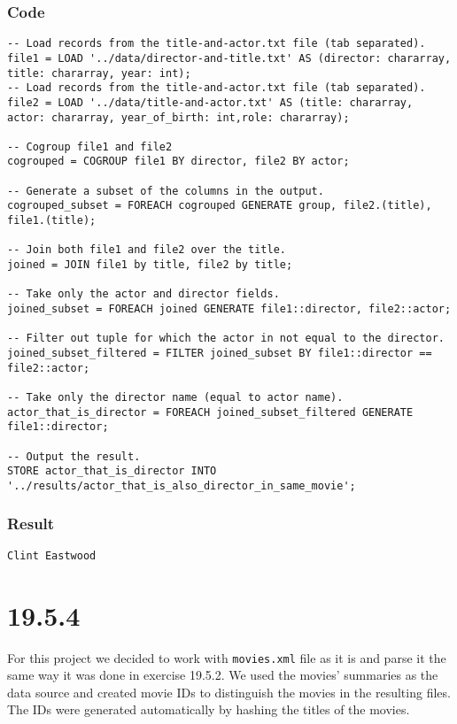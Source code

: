 \documentclass[a4paper, notitlepage]{article}
\begin{document}
\subsubsection{Code}

\begin{lstlisting}
-- Load records from the title-and-actor.txt file (tab separated).
file1 = LOAD '../data/director-and-title.txt' AS (director: chararray, title: chararray, year: int);
-- Load records from the title-and-actor.txt file (tab separated).
file2 = LOAD '../data/title-and-actor.txt' AS (title: chararray, actor: chararray, year_of_birth: int,role: chararray);

-- Cogroup file1 and file2
cogrouped = COGROUP file1 BY director, file2 BY actor;

-- Generate a subset of the columns in the output.
cogrouped_subset = FOREACH cogrouped GENERATE group, file2.(title), file1.(title);

-- Join both file1 and file2 over the title.
joined = JOIN file1 by title, file2 by title;

-- Take only the actor and director fields.
joined_subset = FOREACH joined GENERATE file1::director, file2::actor;

-- Filter out tuple for which the actor in not equal to the director.
joined_subset_filtered = FILTER joined_subset BY file1::director == file2::actor;

-- Take only the director name (equal to actor name).
actor_that_is_director = FOREACH joined_subset_filtered GENERATE file1::director;

-- Output the result.
STORE actor_that_is_director INTO '../results/actor_that_is_also_director_in_same_movie';
\end{lstlisting}

\subsubsection{Result}

\begin{lstlisting}
Clint Eastwood
\end{lstlisting}

\section{19.5.4}

For this project we decided to work with \lstinline{movies.xml} file as it is and parse it the same way it was done in exercise 19.5.2. We used the movies' summaries as the data source and created movie IDs to distinguish the movies in the resulting files. The IDs were generated automatically by hashing the titles of the movies.
\end{document}

